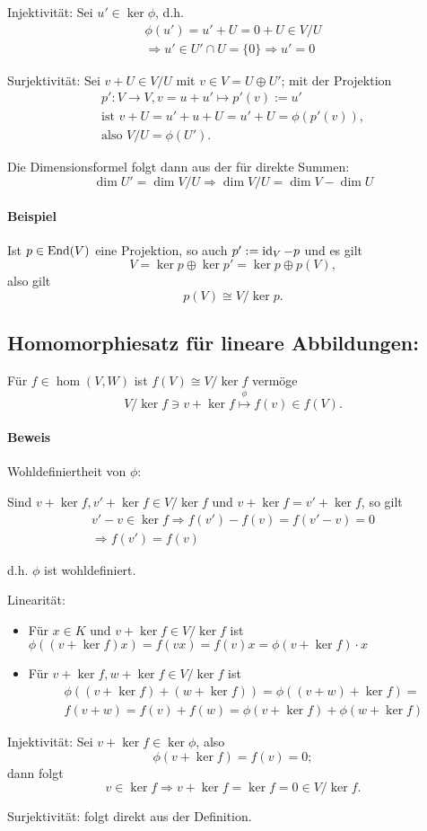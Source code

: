 	Injektivität: Sei $ u'\in \ker \phi $, d.h.
		\begin{gather*}
		\phi(u')=u'+U=0+U\in V/U\\
		\Rightarrow u'\in U'\cap U = \{0\} \Rightarrow u'=0
		\end{gather*}
		
	Surjektivität: Sei $ v+U\in V/U $ mit $ v\in V = U \oplus U' $; mit der Projektion
	\begin{gather*}
		p':V\to V, v=u+u' \mapsto p'(v) := u'\\
		\text{ist } v + U = u' + u + U = u' + U = \phi(p'(v)),\\
		\text{also }V/U = \phi(U').
	\end{gather*}
	
	Die Dimensionsformel folgt dann aus der für direkte Summen:
		\[ \dim U' = \dim V/U \Rightarrow \dim V/U = \dim V-\dim U \]
		
\paragraph{Beispiel}
	Ist $ p\in \operatorname{End}(V) $ eine Projektion, so auch $ p':= \operatorname{id}_V-p $ und es gilt
		\[ V= \ker p \oplus \ker p' = \ker p \oplus p(V), \]
	also gilt
		\[ p(V)\cong V/\ker p. \]

\subsection{Homomorphiesatz für lineare Abbildungen: }
	\begin{Satz}
		Für $ f\in \hom(V,W) $ ist $ f(V)\cong V/\ker f $ vermöge
		\[ V/\ker f\ni v+\ker f \overset{\phi}{\mapsto} f(v)\in f(V). \]
	\end{Satz}

\paragraph{Beweis}
	Wohldefiniertheit von $ \phi $: 
	
	Sind $ v+\ker f, v'+\ker f \in V/\ker f$ und $ v+\ker f = v'+\ker f $, so gilt 
		\begin{gather*}
		v'-v \in \ker f \Rightarrow f(v')-f(v) = f(v'-v) = 0 \\
			\Rightarrow f(v') = f(v)
		\end{gather*}
	
	d.h. $ \phi $ ist wohldefiniert.
	
	Linearität:
		\begin{itemize}
		\item Für $ x\in K $ und $ v+\ker f \in V/\ker f $ ist $ \phi( (v+\ker f)x) =f(vx) = f(v)x = \phi (v+\ker f)\cdot x $
		\item Für $ v+\ker f, w+\ker f\in V/\ker f $ ist 
			\begin{gather*}
			\phi ((v+\ker f)+(w+\ker f) ) = \phi((v+w)+\ker f) =\\
			f(v+w) = f(v)+f(w)=\phi(v+\ker f)+\phi(w+\ker f)
			\end{gather*}
		\end{itemize}
	
	Injektivität:
	Sei $ v+\ker f\in \ker \phi $, also 
		\[ \phi(v+\ker f)= f(v) = 0; \]
	dann folgt
		\[ v\in \ker f \Rightarrow v+\ker f = \ker f = 0\in V/\ker f. \]
	
	Surjektivität:
	folgt direkt aus der Definition.		